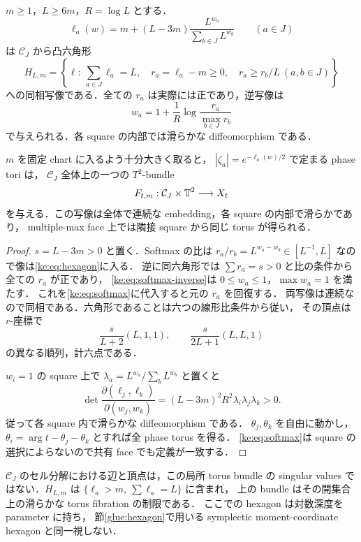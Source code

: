 \begin{proposition}
\label{ke:triple-hexagon}
$m\ge1$，$L\ge6m$，$R=\log L$ とする．
\begin{equation}\label{ke:eq:softmax}
 \ell_a(w)=m+(L-3m)\frac{L^{w_a}}{\sum_{b\in J}L^{w_b}}
 \qquad(a\in J)
\end{equation}
は $\mathcal C_J$ から凸六角形
\begin{equation}\label{ke:eq:hexagon}
 H_{L,m}=\left\{
 \ell:\ \sum_{a\in J}\ell_a=L,\quad
 r_a=\ell_a-m\ge0,\quad r_a\ge r_b/L\ (a,b\in J)
 \right\}
\end{equation}
への同相写像である．全ての $r_a$ は実際には正であり，逆写像は
\begin{equation}\label{ke:eq:softmax-inverse}
 w_a=1+\frac1R\log\frac{r_a}{\max_{b\in J}r_b}
\end{equation}
で与えられる．各 square の内部では滑らかな diffeomorphism である．

$m$ を固定 chart に入るよう十分大きく取ると，
$|\zeta_a|=e^{-\ell_a(w)/2}$ で定まる phase tori は，
$\mathcal C_J$ 全体上の一つの $T^2$-bundle
\[
 F_{t,m}:\mathcal C_J\times\mathbb T^2\longrightarrow X_t
\]
を与える．この写像は全体で連続な embedding，各 square の内部で滑らかであり，
multiple-max face 上では隣接 square から同じ torus が得られる．
\end{proposition}
\begin{proof}
$s=L-3m>0$ と置く．Softmax の比は
$r_a/r_b=L^{w_a-w_b}\in[L^{-1},L]$ なので像は\eqref{ke:eq:hexagon}に入る．
逆に同六角形では $\sum r_a=s>0$ と比の条件から全ての $r_a$ が正であり，
\eqref{ke:eq:softmax-inverse}は $0\le w_a\le1$，$\max w_a=1$ を満たす．
これを\eqref{ke:eq:softmax}に代入すると元の $r_a$ を回復する．
両写像は連続なので同相である．六角形であることは六つの線形比条件から従い，
その頂点は $r$-座標で
\[
 \frac{s}{L+2}(L,1,1),\qquad
 \frac{s}{2L+1}(L,L,1)
\]
の異なる順列，計六点である．

$w_i=1$ の square 上で
$\lambda_a=L^{w_a}/\sum_bL^{w_b}$ と置くと
\[
 \det\frac{\partial(\ell_j,\ell_k)}{\partial(w_j,w_k)}
 =(L-3m)^2R^2\lambda_i\lambda_j\lambda_k>0.
\]
従って各 square 内で滑らかな diffeomorphism である．
$\theta_j,\theta_k$ を自由に動かし，
$\theta_i=\arg t-\theta_j-\theta_k$ とすれば全 phase torus を得る．
\eqref{ke:eq:softmax}は square の選択によらないので共有 face でも定義が一致する．
\end{proof}

\begin{remark}
$\mathcal C_J$ のセル分解における辺と頂点は，この局所 torus bundle の
singular values ではない．$H_{L,m}$ は $\{\ell_a>m,\ \sum\ell_a=L\}$ に含まれ，
上の bundle はその開集合上の滑らかな torus fibration の制限である．
ここでの hexagon は対数深度を parameter に持ち，
節\ref{glue:hexagon}で用いる symplectic moment-coordinate hexagon と同一視しない．
\end{remark}

